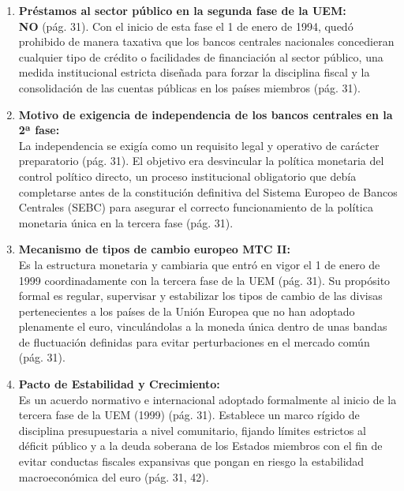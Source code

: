 \begin{enumerate}[label=\arabic*.]
    \item \textbf{Préstamos al sector público en la segunda fase de la UEM:} \\
    \textbf{NO} (pág. 31). Con el inicio de esta fase el 1 de enero de 1994, quedó prohibido de manera taxativa que los bancos centrales nacionales concedieran cualquier tipo de crédito o facilidades de financiación al sector público, una medida institucional estricta diseñada para forzar la disciplina fiscal y la consolidación de las cuentas públicas en los países miembros (pág. 31).

    \item \textbf{Motivo de exigencia de independencia de los bancos centrales en la 2ª fase:} \\
    La independencia se exigía como un requisito legal y operativo de carácter preparatorio (pág. 31). El objetivo era desvincular la política monetaria del control político directo, un proceso institucional obligatorio que debía completarse antes de la constitución definitiva del Sistema Europeo de Bancos Centrales (SEBC) para asegurar el correcto funcionamiento de la política monetaria única en la tercera fase (pág. 31).

    \item \textbf{Mecanismo de tipos de cambio europeo MTC II:} \\
    Es la estructura monetaria y cambiaria que entró en vigor el 1 de enero de 1999 coordinadamente con la tercera fase de la UEM (pág. 31). Su propósito formal es regular, supervisar y estabilizar los tipos de cambio de las divisas pertenecientes a los países de la Unión Europea que no han adoptado plenamente el euro, vinculándolas a la moneda única dentro de unas bandas de fluctuación definidas para evitar perturbaciones en el mercado común (pág. 31).

    \item \textbf{Pacto de Estabilidad y Crecimiento:} \\
    Es un acuerdo normativo e internacional adoptado formalmente al inicio de la tercera fase de la UEM (1999) (pág. 31). Establece un marco rígido de disciplina presupuestaria a nivel comunitario, fijando límites estrictos al déficit público y a la deuda soberana de los Estados miembros con el fin de evitar conductas fiscales expansivas que pongan en riesgo la estabilidad macroeconómica del euro (pág. 31, 42).


\end{enumerate}
